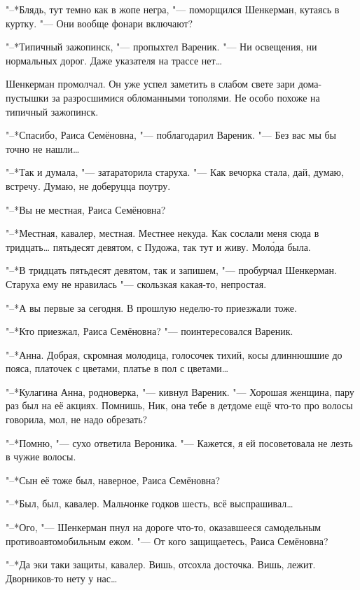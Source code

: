 "--*Блядь, тут темно как в жопе негра, "--- поморщился Шенкерман, кутаясь в куртку.
"--- Они вообще фонари включают?

"--*Типичный зажопинск, "--- пропыхтел Вареник.
"--- Ни освещения, ни нормальных дорог.
Даже указателя на трассе нет\ldots{}

Шенкерман промолчал.
Он уже успел заметить в слабом свете зари дома-пустышки за разросшимися обломанными тополями.
Не особо похоже на типичный зажопинск.

\asterism

\textspace

"--*Спасибо, Раиса Семёновна, "--- поблагодарил Вареник.
"--- Без вас мы бы точно не нашли\ldots{}

"--*Так и думала, "--- затараторила старуха.
"--- Как вечорка стала, дай, думаю, встречу.
Думаю, не доберуцца поутру.

"--*Вы не местная, Раиса Семёновна?

"--*Местная, кавалер, местная.
Местнее некуда.
Как сослали меня сюда в тридцать\ldots{} пятьдесят девятом, с Пудожа, так тут и живу.
Мол\'ода была.

"--*В тридцать пятьдесят девятом, так и запишем, "--- пробурчал Шенкерман.
Старуха ему не нравилась "--- скользкая какая-то, непростая.

"--*А вы первые за сегодня.
В прошлую неделю-то приезжали тоже.

"--*Кто приезжал, Раиса Семёновна? "--- поинтересовался Вареник.

"--*Анна.
Добрая, скромная молодица, голосочек тихий, косы длиннюшшие до пояса, платочек с цветами, платье в пол с цветами\ldots{}

"--*Кулагина Анна, родноверка, "--- кивнул Вареник.
"--- Хорошая женщина, пару раз был на её акциях.
Помнишь, Ник, она тебе в детдоме ещё что-то про волосы говорила, мол, не надо обрезать?

"--*Помню, "--- сухо ответила Вероника.
"--- Кажется, я ей посоветовала не лезть в чужие волосы.

"--*Сын её тоже был, наверное, Раиса Семёновна?

"--*Был, был, кавалер.
Мальчонке годков шесть, всё выспрашивал\ldots{}

"--*Ого, "--- Шенкерман пнул на дороге что-то, оказавшееся самодельным противоавтомобильным ежом.
"--- От кого защищаетесь, Раиса Семёновна?

"--*Да эки таки защиты, кавалер.
Вишь, отсохла досточка.
Вишь, лежит.
Дворников-то нету у нас\ldots{}

